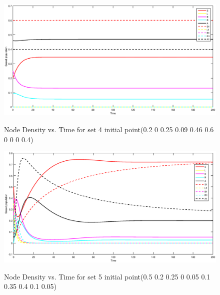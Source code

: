 \newpage
\begin{figure}[h!]
\centering
  \includegraphics[width=7.0in]{5.eps}\\
  \caption{Node Density vs. Time for set 4 initial point(0.2 0 0.25 0.09 0.46 0.6 0 0 0 0.4)}\label{fig:ff5}
\end{figure}

\begin{figure}[h!]
\centering
  \includegraphics[width=7.0in]{7.eps}\\
  \caption{Node Density vs. Time for set 5 initial point(0.5 0.2 0.25 0 0.05 0.1 0.35 0.4 0.1 0.05)}\label{fig:ff6}
\end{figure}

